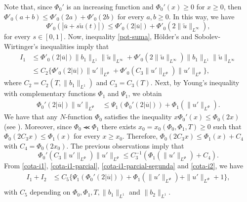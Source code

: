 \documentclass[twoside]{elsarticle}
\theoremstyle{remark}
\newcommand{\orlnor}{\|_{L^{\Phi}}}
\renewcommand{\leq}{\leqslant}
\renewcommand{\geq}{\geqslant}
\begin{document}
Note that, since $\Phi_0'$ is an increasing function  and $\Phi_0'(x)\geq 0$ for $x\geq 0$, then
$\Phi'_0(a+b)\leq \Phi'_0(2a)+\Phi'_0(2b)$ for every $a,b\geq 0$.
In this way, we have
\begin{equation}\label{pot-suma}
\Phi'_0(|\overline{u}+s\tilde{u}(t)|)\leq
\Phi'_0(2|\overline{u}|)+\Phi'_0(2\|\tilde{u}\|_{L^{\infty}}),
\end{equation}
for every $s \in [0,1]$.  Now,  inequality \eqref{pot-suma}, H\"older's and Sobolev-Wirtinger's inequalities imply that
\begin{equation}\label{cota-i1}
\begin{split}
I_1&
\leq \Phi'_0(2|\overline{u}|) \|b_1\|_{L^1} \|\tilde{u}\|_{L^{\infty}}+\Phi'_0(2\|\tilde{u}\|_{L^\infty})
 \|b_1\|_{L^1}\|\tilde{u}\|_{L^\infty}
\\
&\leq C_2 \bigg\{ \Phi'_0(2|\overline{u}|) \|u'\orlnor
+\Phi'_0(C_3\|u'\orlnor) \|u'\orlnor\bigg\},
\end{split}
\end{equation}
where $C_2=C_2(T, \|b_1\|_{L^1} )$ and $C_3=C_3(T)$.
Next, by Young's inequality with complementary functions $\Phi_1$ and $\Psi_1$, we obtain
%
\begin{equation}\label{cota-i1-parcial}
 \begin{split}
\Phi_0'(2|\overline{u}|) \|u'\orlnor
&\leq
\Psi_1(\Phi_0'(2|\overline{u}|))+
\Phi_1(\|u'\orlnor).
\end{split}
\end{equation}
%
We have that any $N$-function $\Phi_0$ satisfies the inequality $x\Phi_0'(x)\leq \Phi_0(2x)$ (see \cite[p. 17]{rao1991theory}).
Moreover, since $\Phi_0\llcurly\Phi_1$ there exists $x_0=x_0(\Phi_0,\Phi_1,T)\geq 0$ such that $\Phi_0(2C_3x)\leq \Phi_1(x)$
for every $x\geq x_0$. Therefore, $\Phi_0(2C_3x)\leq \Phi_1(x)+C_4$ with $C_4=\Phi_0(2x_0)$. The previous observations imply that
\begin{equation}\label{cota-i1-parcial-segunda}
\Phi_0'(C_3\|u'\orlnor) \|u'\orlnor
\leq
C_3^{-1}(\Phi_1(\|u'\orlnor)+C_4).
\end{equation}
From \eqref{cota-i1}, \eqref{cota-i1-parcial}, \eqref{cota-i1-parcial-segunda} and \eqref{cota-i2}, we have
\begin{equation}\label{cota-i1-i2}
\begin{split}
I_1+I_2
&
\leq C_5
\bigg\{
\Psi_1(\Phi_0'(2|\overline{u}|))
+\Phi_1(\|u'\orlnor)
+\|u'\orlnor +1
\bigg\},\\
\end{split}
\end{equation}
with $C_5$ depending on $\Phi_0, \Phi_1, T, \|b_1\|_{L^1}$ and $\|b_2\|_{L^1} $.
\end{document}
